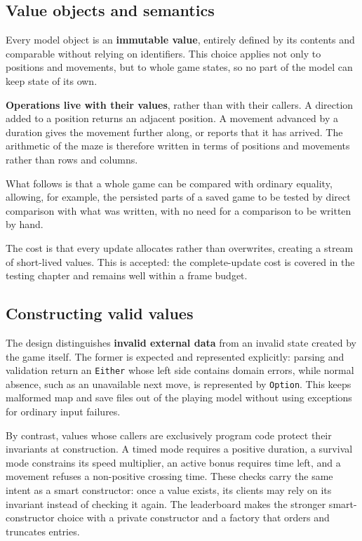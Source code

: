 \subsection{Value objects and semantics}

Every model object is an \textbf{immutable value}, entirely defined by its contents and comparable without relying on
identifiers. This choice applies not only to positions and movements, but to whole game states, so no part of the model
can keep state of its own.

\textbf{Operations live with their values}, rather than with their callers. A direction added to a position returns an
adjacent position. A movement advanced by a duration gives the movement further along, or reports that it has arrived.
The arithmetic of the maze is therefore written in terms of positions and movements rather than rows and columns.

What follows is that a whole game can be compared with ordinary equality, allowing, for example, the persisted parts of
a saved game to be tested by direct comparison with what was written, with no need for a comparison to be written by hand.

The cost is that every update allocates rather than overwrites, creating a stream of short-lived values. This is
accepted: the complete-update cost is covered in the testing chapter and remains well within a frame budget.

\subsection{Constructing valid values}

The design distinguishes \textbf{invalid external data} from an invalid state created by the game itself. The former
is expected and represented explicitly: parsing and validation return an \texttt{Either} whose left side contains
domain errors, while normal absence, such as an unavailable next move, is represented by \texttt{Option}. This keeps
malformed map and save files out of the playing model without using exceptions for ordinary input failures.

By contrast, values whose callers are exclusively program code protect their invariants at construction. A timed
mode requires a positive duration, a survival mode constrains its speed multiplier, an active bonus requires time
left, and a movement refuses a non-positive crossing time. These checks carry the same intent as a smart constructor:
once a value exists, its clients may rely on its invariant instead of checking it again. The leaderboard makes the
stronger smart-constructor choice with a private constructor and a factory that orders and truncates entries.

